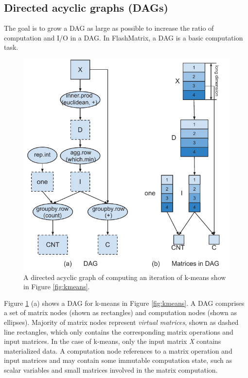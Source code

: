
\subsection{Directed acyclic graphs (DAGs)}
The goal is to grow a DAG as large as possible to increase
the ratio of computation and I/O in a DAG. In FlashMatrix, a DAG is a basic
computation task.

\begin{figure}
	\centering
	\includegraphics[scale=0.7]{FlashMatrix_figs/KMeans.pdf}
	\caption{A directed acyclic graph of computing an iteration of k-means
	show in Figure \ref{fig:kmeans}.}
	\label{fig:DAG}
\end{figure}

Figure \ref{fig:DAG} (a) shows a DAG for k-means in Figure
\ref{fig:kmeans}. A DAG comprises a set of matrix nodes (shown as rectangles)
and computation nodes (shown as ellipses). Majority of matrix nodes represent
\textit{virtual matrices}, shown as dashed line rectangles, which only contains
the corresponding matrix operations and input matrices. In the case of k-means,
only the input matrix \textit{X} contains materialized data.
A computation node references to a matrix operation and input matrices and
may contain some immutable computation state, such as scalar variables and
small matrices involved in the matrix computation. 

